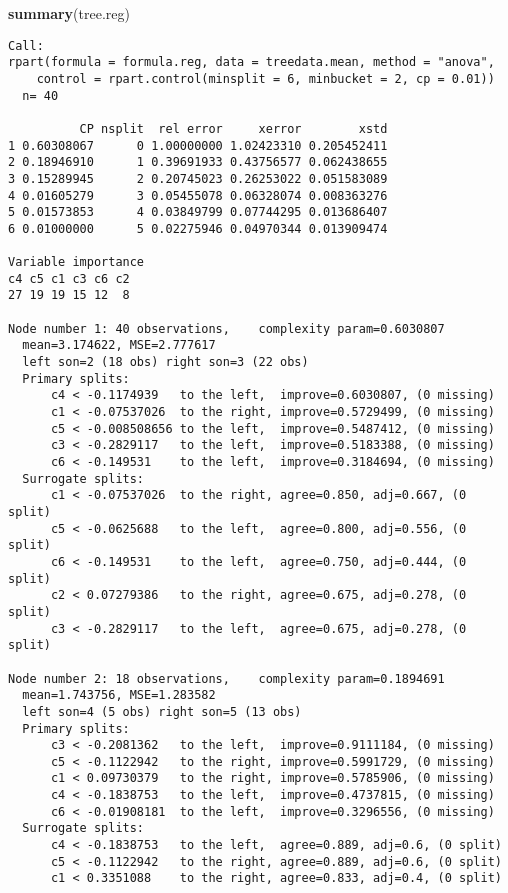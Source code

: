 \documentclass[]{article}
\newenvironment{Shaded}{\begin{snugshade}}{\end{snugshade}}
\newcommand{\KeywordTok}[1]{\textcolor[rgb]{0.13,0.29,0.53}{\textbf{{#1}}}}
\newcommand{\NormalTok}[1]{{#1}}
\begin{document}
\begin{Shaded}
\begin{Highlighting}[]
\KeywordTok{summary}\NormalTok{(tree.reg)}
\end{Highlighting}
\end{Shaded}

\begin{verbatim}
Call:
rpart(formula = formula.reg, data = treedata.mean, method = "anova", 
    control = rpart.control(minsplit = 6, minbucket = 2, cp = 0.01))
  n= 40 

          CP nsplit  rel error     xerror        xstd
1 0.60308067      0 1.00000000 1.02423310 0.205452411
2 0.18946910      1 0.39691933 0.43756577 0.062438655
3 0.15289945      2 0.20745023 0.26253022 0.051583089
4 0.01605279      3 0.05455078 0.06328074 0.008363276
5 0.01573853      4 0.03849799 0.07744295 0.013686407
6 0.01000000      5 0.02275946 0.04970344 0.013909474

Variable importance
c4 c5 c1 c3 c6 c2 
27 19 19 15 12  8 

Node number 1: 40 observations,    complexity param=0.6030807
  mean=3.174622, MSE=2.777617 
  left son=2 (18 obs) right son=3 (22 obs)
  Primary splits:
      c4 < -0.1174939   to the left,  improve=0.6030807, (0 missing)
      c1 < -0.07537026  to the right, improve=0.5729499, (0 missing)
      c5 < -0.008508656 to the left,  improve=0.5487412, (0 missing)
      c3 < -0.2829117   to the left,  improve=0.5183388, (0 missing)
      c6 < -0.149531    to the left,  improve=0.3184694, (0 missing)
  Surrogate splits:
      c1 < -0.07537026  to the right, agree=0.850, adj=0.667, (0 split)
      c5 < -0.0625688   to the left,  agree=0.800, adj=0.556, (0 split)
      c6 < -0.149531    to the left,  agree=0.750, adj=0.444, (0 split)
      c2 < 0.07279386   to the right, agree=0.675, adj=0.278, (0 split)
      c3 < -0.2829117   to the left,  agree=0.675, adj=0.278, (0 split)

Node number 2: 18 observations,    complexity param=0.1894691
  mean=1.743756, MSE=1.283582 
  left son=4 (5 obs) right son=5 (13 obs)
  Primary splits:
      c3 < -0.2081362   to the left,  improve=0.9111184, (0 missing)
      c5 < -0.1122942   to the right, improve=0.5991729, (0 missing)
      c1 < 0.09730379   to the right, improve=0.5785906, (0 missing)
      c4 < -0.1838753   to the left,  improve=0.4737815, (0 missing)
      c6 < -0.01908181  to the left,  improve=0.3296556, (0 missing)
  Surrogate splits:
      c4 < -0.1838753   to the left,  agree=0.889, adj=0.6, (0 split)
      c5 < -0.1122942   to the right, agree=0.889, adj=0.6, (0 split)
      c1 < 0.3351088    to the right, agree=0.833, adj=0.4, (0 split)


\end{verbatim}
\end{document}
